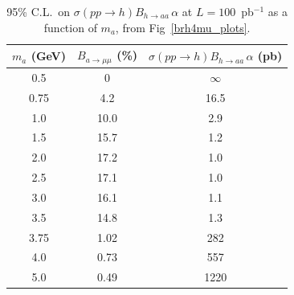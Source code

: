 \documentclass[aps,prd,onecolumn,superscriptaddress,showpacs]{revtex4}
\begin{document}
\begin{table}[htb]
\caption{95\% C.L.\ on $\sigma(pp \to h) B_{h \to aa} \, \alpha$ at $L = 100$~pb$^{-1}$ as a function of $m_a$, from Fig~\ref{brh4mu_plots}. \label{table_bramumu_factorized}}
\begin{center}
\renewcommand{\arraystretch}{1.1}
\begin{tabular}{| c | c | c |}
\hline
\mbox{\hspace{0.25 cm}}$m_a$ (GeV)\mbox{\hspace{0.25 cm}} & \mbox{\hspace{0.25 cm}}$B_{a \to \mu\mu}$ (\%)\mbox{\hspace{0.25 cm}} & \mbox{\hspace{0.25 cm}}$\sigma(pp \to h) B_{h \to aa} \, \alpha$ (pb)\mbox{\hspace{0.25 cm}} \\\hline
0.5 & 0 & $\infty$ \\
0.75 & 4.2 & 16.5 \\
1.0 & 10.0 & 2.9 \\
1.5 & 15.7 & 1.2 \\
2.0 & 17.2 & 1.0 \\
2.5 & 17.1 & 1.0 \\
3.0 & 16.1 & 1.1 \\
3.5 & 14.8 & 1.3 \\
3.75 & 1.02 & 282 \\
4.0 & 0.73 & 557 \\
5.0 & 0.49 & 1220 \\\hline
\end{tabular}
\end{center}
\end{table}
\end{document}

